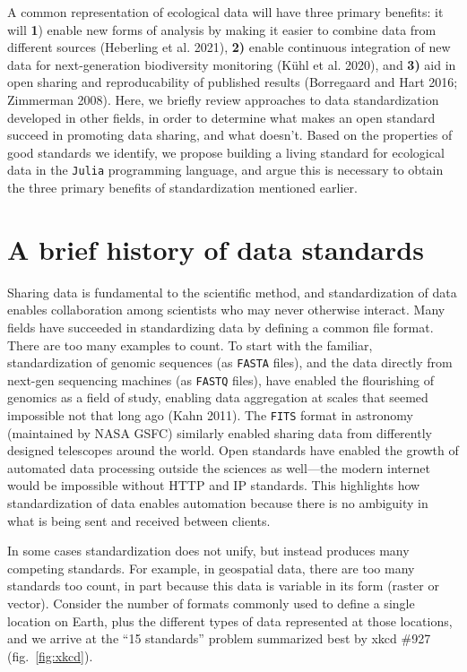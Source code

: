\documentclass[11pt]{article}
\begin{document}
A common representation of ecological data will have three primary
benefits: it will \textbf{1}) enable new forms of analysis by making it
easier to combine data from different sources (Heberling et al. 2021),
\textbf{2)} enable continuous integration of new data for
next-generation biodiversity monitoring (Kühl et al. 2020), and
\textbf{3)} aid in open sharing and reproducability of published results
(Borregaard and Hart 2016; Zimmerman 2008). Here, we briefly review
approaches to data standardization developed in other fields, in order
to determine what makes an open standard succeed in promoting data
sharing, and what doesn't. Based on the properties of good standards we
identify, we propose building a living standard for ecological data in
the \texttt{Julia} programming language, and argue this is necessary to
obtain the three primary benefits of standardization mentioned earlier.

\hypertarget{a-brief-history-of-data-standards}{%
\section{A brief history of data
standards}\label{a-brief-history-of-data-standards}}

Sharing data is fundamental to the scientific method, and
standardization of data enables collaboration among scientists who may
never otherwise interact. Many fields have succeeded in standardizing
data by defining a common file format. There are too many examples to
count. To start with the familiar, standardization of genomic sequences
(as \texttt{FASTA} files), and the data directly from next-gen
sequencing machines (as \texttt{FASTQ} files), have enabled the
flourishing of genomics as a field of study, enabling data aggregation
at scales that seemed impossible not that long ago (Kahn 2011). The
\texttt{FITS} format in astronomy (maintained by NASA GSFC) similarly
enabled sharing data from differently designed telescopes around the
world. Open standards have enabled the growth of automated data
processing outside the sciences as well---the modern internet would be
impossible without HTTP and IP standards. This highlights how
standardization of data enables automation because there is no ambiguity
in what is being sent and received between clients.

In some cases standardization does not unify, but instead produces many
competing standards. For example, in geospatial data, there are too many
standards too count, in part because this data is variable in its form
(raster or vector). Consider the number of formats commonly used to
define a single location on Earth, plus the different types of data
represented at those locations, and we arrive at the ``15 standards''
problem summarized best by xkcd \#927 (fig.~\ref{fig:xkcd}).
\end{document}
